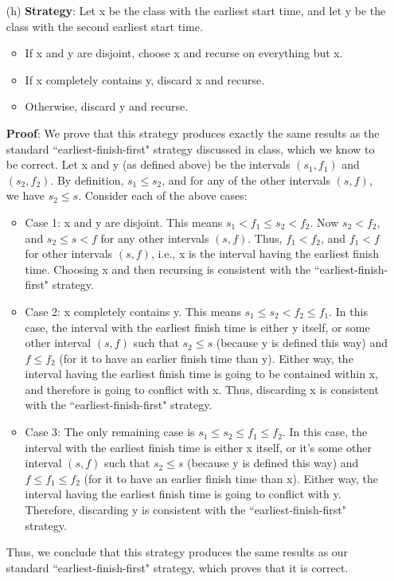 \documentclass[11pt, fleqn]{article}
\begin{document}
\begin{itemize}
    \item[(h)]
    \textbf{Strategy}: Let x be the class with the earliest start time, and let y be the class with the second earliest start time.
    \begin{itemize}
        \item If x and y are disjoint, choose x and recurse on everything but x.
        \item If x completely contains y, discard x and recurse.
        \item Otherwise, discard y and recurse.
    \end{itemize}
    \textbf{Proof}: We prove that this strategy produces exactly the same results as the standard ``earliest-finish-first" strategy discussed in class, which we know to be correct. Let x and y (as defined above) be the intervals $(s_1, f_1)$ and $(s_2, f_2)$. By definition, $s_1 \leq s_2$, and for any of the other intervals $(s, f)$, we have $s_2 \leq s$. Consider each of the above cases:
    \begin{itemize}
        \item Case 1: x and y are disjoint. This means $s_1 < f_1 \leq s_2 < f_2$. Now $s_2 < f_2$, and $s_2 \leq s < f$ for any other intervals $(s, f)$. Thus, $f_1 < f_2$, and $f_1 < f$ for other intervals $(s, f)$, i.e., x is the interval having the earliest finish time. Choosing x and then recursing is consistent with the ``earliest-finish-first" strategy.
        \item Case 2: x completely contains y. This means $s_1 \leq s_2 < f_2 \leq f_1$. In this case, the interval with the earliest finish time is either y itself, or some other interval $(s, f)$ such that $s_2 \leq s$ (because y is defined this way) and $f \leq f_2$ (for it to have an earlier finish time than y). Either way, the interval having the earliest finish time is going to be contained within x, and therefore is going to conflict with x. Thus, discarding x is consistent with the ``earliest-finish-first" strategy.
        \item Case 3: The only remaining case is $s_1 \leq s_2 \leq f_1 \leq f_2$. In this case, the interval with the earliest finish time is either x itself, or it's some other interval $(s, f)$ such that $s_2 \leq s$ (because y is defined this way) and $f \leq f_1 \leq f_2$ (for it to have an earlier finish time than x). Either way, the interval having the earliest finish time is going to conflict with y. Therefore, discarding y is consistent with the ``earliest-finish-first" strategy.
    \end{itemize}
    Thus, we conclude that this strategy produces the same results as our standard ``earliest-finish-first" strategy, which proves that it is correct.
    

\end{itemize}
\end{document}
